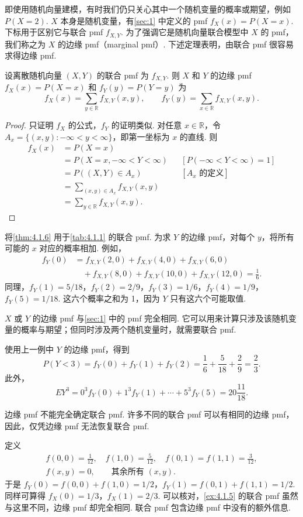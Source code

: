 即使用随机向量建模，有时我们仍只关心其中一个随机变量的概率或期望，例如 $P(X=2)$. $X$ 本身是随机变量，有\autoref{sec:1} 中定义的 pmf $f_X(x)=P(X=x)$. 下标用于区别它与联合 pmf $f_{X,Y}$. 为了强调它是随机向量联合模型中 $X$ 的 pmf，我们称之为 $X$ 的边缘 pmf（marginal pmf）. 下述定理表明，由联合 pmf 很容易求得边缘 pmf.
\begin{theorem}\label{thm:4.1.6}
设离散随机向量 $(X,Y)$ 的联合 pmf 为 $f_{X,Y}$. 则 $X$ 和 $Y$ 的边缘 pmf $f_X(x)=P(X=x)$ 和 $f_Y(y)=P(Y=y)$ 为
$$f_X(x)=\sum_{y\in\mathbb R}f_{X,Y}(x,y),\qquad f_Y(y)=\sum_{x\in\mathbb R}f_{X,Y}(x,y).$$
\end{theorem}
\begin{proof}
只证明 $f_X$ 的公式，$f_Y$ 的证明类似. 对任意 $x\in\mathbb R$，令 $A_x=\{(x,y):-\infty<y<\infty\}$，即第一坐标为 $x$ 的直线. 则
$$
\begin{aligned}
f_X(x)&=P(X=x)\\
&=P(X=x,-\infty<Y<\infty)&&[P(-\infty<Y<\infty)=1]\\
&=P((X,Y)\in A_x)&&[A_x\text{ 的定义}]\\
&=\sum_{(x,y)\in A_x}f_{X,Y}(x,y)\\
&=\sum_{y\in\mathbb R}f_{X,Y}(x,y).
\end{aligned}
$$
\end{proof}
\begin{example}\label{ex:4.1.7}
将\autoref{thm:4.1.6} 用于\autoref{tab:4.1.1} 的联合 pmf. 为求 $Y$ 的边缘 pmf，对每个 $y$，将所有可能的 $x$ 对应的概率相加. 例如，
$$
\begin{aligned}
f_Y(0)&=f_{X,Y}(2,0)+f_{X,Y}(4,0)+f_{X,Y}(6,0)\\
&\quad+f_{X,Y}(8,0)+f_{X,Y}(10,0)+f_{X,Y}(12,0)=\frac16.
\end{aligned}
$$
同理，$f_Y(1)=5/18$，$f_Y(2)=2/9$，$f_Y(3)=1/6$，$f_Y(4)=1/9$，$f_Y(5)=1/18$. 这六个概率之和为 1，因为 $Y$ 只有这六个可能取值.
\end{example}

$X$ 或 $Y$ 的边缘 pmf 与\autoref{sec:1} 中的 pmf 完全相同. 它可以用来计算只涉及该随机变量的概率与期望；但同时涉及两个随机变量时，就需要联合 pmf.
\begin{example}[骰子的概率]\label{ex:4.1.8}
使用上一例中 $Y$ 的边缘 pmf，得到
$$P(Y<3)=f_Y(0)+f_Y(1)+f_Y(2)=\frac16+\frac5{18}+\frac29=\frac23.$$
此外，
$$EY^3=0^3f_Y(0)+1^3f_Y(1)+\cdots+5^3f_Y(5)=20\frac{11}{18}.$$
\end{example}
边缘 pmf 不能完全确定联合 pmf. 许多不同的联合 pmf 可以有相同的边缘 pmf，因此，仅凭边缘 pmf 无法恢复联合 pmf.
\begin{example}\label{ex:4.1.9}
定义
$$
\begin{gathered}
f(0,0)=\frac1{12},\quad f(1,0)=\frac5{12},\quad f(0,1)=f(1,1)=\frac3{12},\\
f(x,y)=0,\qquad\text{其余所有 }(x,y).
\end{gathered}
$$
于是 $f_Y(0)=f(0,0)+f(1,0)=1/2$，$f_Y(1)=f(0,1)+f(1,1)=1/2$. 同样可算得 $f_X(0)=1/3$，$f_X(1)=2/3$. 可以核对，\autoref{ex:4.1.5} 的联合 pmf 虽然与这里不同，边缘 pmf 却完全相同. 联合 pmf 包含边缘 pmf 中没有的额外信息.
\end{example}

